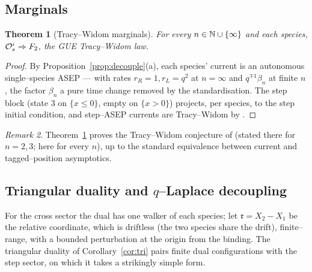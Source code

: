 \documentclass[11pt]{article}
\theoremstyle{plain}
\newtheorem{theorem}{Theorem}[section]
\theoremstyle{definition}
\theoremstyle{remark}
\newtheorem{remark}[theorem]{Remark}
\newcommand{\To}{\Rightarrow}\newcommand{\so}{\mathfrak{so}}
\begin{document}
\subsection{Marginals}
\begin{theorem}[Tracy--Widom marginals]\label{thm:marg}
For every $n\in\mathbb{N}\cup\{\infty\}$ and each species, $\cO^i_s\To F_2$, the GUE
Tracy--Widom law.
\end{theorem}
\begin{proof}
By Proposition~\ref{prop:decouple}(a), each species' current
is an autonomous single--species ASEP --- with rates $r_R=1,r_L=q^2$ at $n=\infty$ and
$q^{\mp1}\beta_n$ at finite $n$, the factor $\beta_n$ a pure time change removed by
the standardisation. The step block (state $3$ on $\{x\le0\}$, empty on $\{x>0\}$)
projects, per species, to the step initial condition, and step--ASEP currents are
Tracy--Widom by \cite[Thm.~1.4]{BCS}.
\end{proof}

\begin{remark}
Theorem~\ref{thm:marg} proves the Tracy--Widom conjecture of \cite[\S3.1.1]{REU}
(stated there for $n=2,3$; here for every $n$), up to the standard equivalence
between current and tagged--position asymptotics.
\end{remark}

\subsection{Triangular duality and $q$--Laplace decoupling}
For the cross sector the dual has one walker of each species; let
$\mathfrak r=X_2-X_1$ be the relative coordinate, which is driftless (the two species
share the drift), finite--range, with a bounded perturbation at the origin from the
binding. The triangular duality of Corollary~\ref{cor:tri} pairs finite dual
configurations with the step sector, on which it takes a strikingly simple form.
\end{document}
